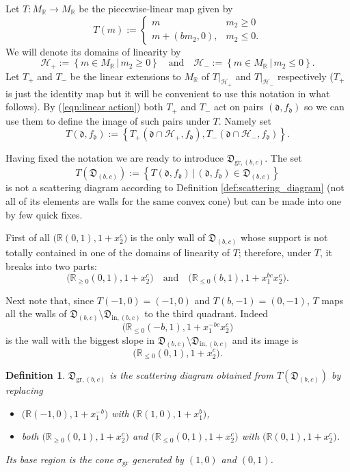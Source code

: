 \documentclass[10pt]{amsart}
\newtheorem{defn}[theorem]{Definition}
\theoremstyle{remark}
\numberwithin{equation}{section}
\newcommand{\RR}{\mathbb{R}}
\newcommand{\fd}{\mathfrak{d}}
\newcommand{\fD}{\mathfrak{D}}
\newcommand{\gr}{\mathrm{gr}}
\begin{document}
Let $T:M_\RR\rightarrow M_\RR$ be the piecewise-linear map given by
\[
  T (m) := 
  \begin{cases}
    m   & m_2 \geq 0 \\
    m + (bm_2,0), & m_2 \leq 0.
  \end{cases}
\]
We will denote its domains of linearity by 
\[ 
  \mathcal{H}_{+} := 
  \left\{ m \in M_{\mathbb{R}}\, |\, m_2 \geq 0 \right\} 
  \quad
  \mbox{and}
  \quad
  \mathcal{H}_{-} := 
  \left\{ m \in M_{\mathbb{R}} \,|\, m_2 \leq 0 \right\}.
\]
Let $T_+$ and $T_-$ be the linear extensions to $M_\RR$ of $T|_{\mathcal{H}_+}$
and $T|_{\mathcal{H}_-}$ respectively ($T_+$ is just the identity map but it
will be convenient to use this notation in what follows). 
By (\ref{eqn:linear action}) both $T_+$ and $T_-$ act on pairs $(\fd,f_\fd)$ so
we can use them to define the image of such pairs under $T$. Namely set
\[
  T(\fd,f_\fd):=
  \left\{
    T_+\left(\fd\cap\mathcal{H}_+,f_\fd\right),
    T_-\left(\fd\cap\mathcal{H}_-,f_\fd\right)
  \right\}.
\]

Having fixed the notation we are ready to introduce $\fD_{\mathrm{gr},(b,c)}$.
The set
\[
  T(\fD_{(b,c)}):=
  \left\{
    T(\fd,f_\fd)\, |\, (\fd,f_\fd)\in \fD_{(b,c)}
  \right\}
\]
is not a scattering diagram according to Definition 
\ref{def:scattering_diagram} (not all of its elements are walls for the same
convex cone) but can be made into one by few quick fixes.

First of all $\big( \RR (0,1), 1+x_2^c\big)$ is the only wall of $\fD_{(b,c)}$
whose support is not totally contained in one of the domains of linearity of
$T$; therefore, under $T$, it breaks into two parts:
\[
  \big( \RR_{\ge0} (0,1), 1+x_2^c\big)
  \quad
  \mbox{and}
  \quad
  \big( \RR_{\le 0} (b,1), 1+x_1^{bc}x_2^c\big).
\]

Next note that, since $T(-1,0)=(-1,0)$ and $T(b,-1)=(0,-1)$, $T$ maps all the
walls of $\fD_{(b,c)}\setminus\fD_{\mathrm{in},(b,c)}$ to the third quadrant. 
Indeed 
\[
  \big(\RR_{\leq0}(-b,1),1+x_1^{-bc}x_2^c\big)
\]
is the wall with the biggest slope in
$\fD_{(b,c)}\setminus\fD_{\mathrm{in},(b,c)}$ and its image is 
\[
  \big( \RR_{\le0} (0,1), 1+x_2^c\big).
\]

\begin{defn}
  $\fD_{\gr,(b,c)}$ is the scattering diagram obtained from
  $T\left(\fD_{(b,c)}\right)$ by replacing 
  \begin{itemize}
    \item
      $\big(\RR (-1,0), 1+x_1^{-b}\big)$ with $\big(\RR  (1,0), 1+x_1^b\big)$,
    \item 
      both $ \big( \RR_{\ge0} (0,1), 1+x_2^c\big)$ and $\big( \RR_{\le0} (0,1),
      1+x_2^c\big)$ with $ \big( \RR (0,1), 1+x_2^c\big)$.
  \end{itemize}
  Its base region is the cone $\sigma_\gr$ generated by $(1,0)$ and $(0,1)$.
\end{defn}
\end{document}
